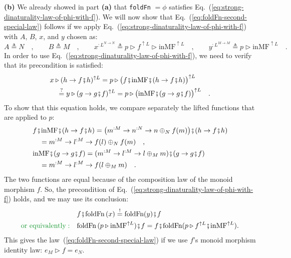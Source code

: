 \textbf{(b)} We already showed in part \textbf{(a)} that \lstinline!foldFn!
$=\phi$ satisfies Eq.~(\ref{eq:strong-dinaturality-law-of-phi-with-f}).
We will now show that Eq.~(\ref{eq:foldFn-second-special-law}) follows
if we apply Eq.~(\ref{eq:strong-dinaturality-law-of-phi-with-f})
with $A$, $B$, $x$, and $y$ chosen as:
\[
A\triangleq N\quad,\quad\quad B\triangleq M\quad,\quad\quad x^{:L^{N\rightarrow N}}\triangleq p\triangleright f^{\uparrow L}\triangleright\text{inMF}^{\uparrow L}\quad,\quad\quad y^{:L^{M\rightarrow M}}\triangleq p\triangleright\text{inMF}^{\uparrow L}\quad.
\]
In order to use Eq.~(\ref{eq:strong-dinaturality-law-of-phi-with-f}),
we need to verify that its precondition is satisfied:
\begin{align*}
 & x\triangleright(h\rightarrow f\bef h)^{\uparrow L}=p\triangleright\big(f\bef\text{inMF}\bef(h\rightarrow f\bef h)\big)^{\uparrow L}\\
 & \quad\overset{?}{=}y\triangleright(g\rightarrow g\bef f)^{\uparrow L}=p\triangleright\big(\text{inMF}\bef(g\rightarrow g\bef f)\big)^{\uparrow L}\quad.
\end{align*}
To show that this equation holds, we compare separately the lifted
functions that are applied to $p$:
\begin{align*}
 & f\bef\text{inMF}\bef(h\rightarrow f\bef h)=\big(m^{:M}\rightarrow n^{:N}\rightarrow n\oplus_{N}f(m)\big)\bef(h\rightarrow f\bef h)\\
 & \quad=m^{:M}\rightarrow l^{:M}\rightarrow f(l)\oplus_{N}f(m)\quad,\\
 & \text{inMF}\bef(g\rightarrow g\bef f)=(m^{:M}\rightarrow l^{:M}\rightarrow l\oplus_{M}m)\bef(g\rightarrow g\bef f)\\
 & \quad=m^{:M}\rightarrow l^{:M}\rightarrow f(l\oplus_{M}m)\quad.
\end{align*}
The two functions are equal because of the composition law of the
monoid morphism $f$. So, the precondition of Eq.~(\ref{eq:strong-dinaturality-law-of-phi-with-f})
holds, and we may use its conclusion:
\begin{align*}
 & f\bef\text{foldFn}\,(x)\overset{!}{=}\text{foldFn}(y)\bef f\\
{\color{greenunder}\text{or equivalently}:}\quad & \text{foldFn}\,(p\triangleright\text{inMF}^{\uparrow L})\bef f=f\bef\text{foldFn}(p\triangleright f^{\uparrow L}\bef\text{inMF}^{\uparrow L}).
\end{align*}
This gives the law~(\ref{eq:foldFn-second-special-law}) if we use
$f$\textsf{'}s monoid morphism identity law: $e_{M}\triangleright f=e_{N}$.

